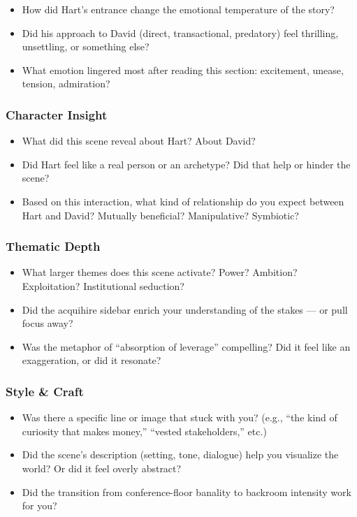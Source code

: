 \begin{itemize}
  \item How did Hart’s entrance change the emotional temperature of the story?
  \item Did his approach to David (direct, transactional, predatory) feel thrilling, unsettling, or something else?
  \item What emotion lingered most after reading this section: excitement, unease, tension, admiration?
\end{itemize}

\subsubsection*{Character Insight}

\begin{itemize}
  \item What did this scene reveal about Hart? About David?
  \item Did Hart feel like a real person or an archetype? Did that help or hinder the scene?
  \item Based on this interaction, what kind of relationship do you expect between Hart and David? Mutually beneficial? Manipulative? Symbiotic?
\end{itemize}

\subsubsection*{Thematic Depth}

\begin{itemize}
  \item What larger themes does this scene activate? Power? Ambition? Exploitation? Institutional seduction?
  \item Did the acquihire sidebar enrich your understanding of the stakes — or pull focus away?
  \item Was the metaphor of “absorption of leverage” compelling? Did it feel like an exaggeration, or did it resonate?
\end{itemize}

\subsubsection*{Style \& Craft}

\begin{itemize}
  \item Was there a specific line or image that stuck with you? (e.g., “the kind of curiosity that makes money,” “vested stakeholders,” etc.)
  \item Did the scene’s description (setting, tone, dialogue) help you visualize the world? Or did it feel overly abstract?
  \item Did the transition from conference-floor banality to backroom intensity work for you?
\end{itemize}

